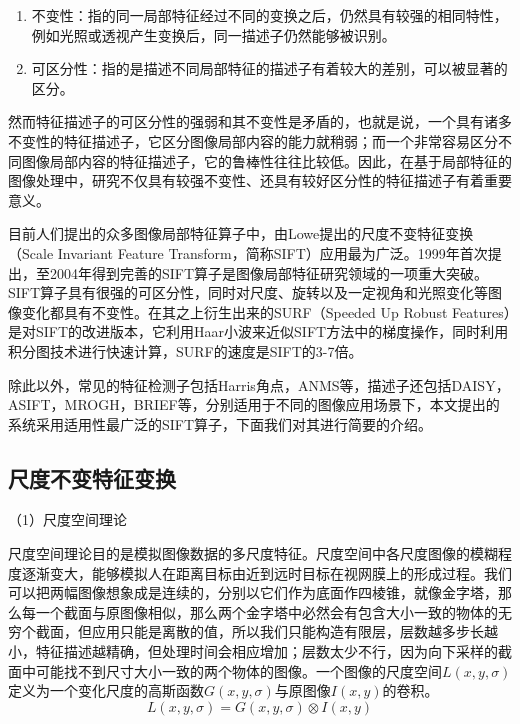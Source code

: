 \begin{enumerate}
\item 不变性：指的同一局部特征经过不同的变换之后，仍然具有较强的相同特性，例如光照或透视产生变换后，同一描述子仍然能够被识别。
\item 可区分性：指的是描述不同局部特征的描述子有着较大的差别，可以被显著的区分。
\end{enumerate}

然而特征描述子的可区分性的强弱和其不变性是矛盾的，也就是说，一个具有诸多不变性的特征描述子，它区分图像局部内容的能力就稍弱；而一个非常容易区分不同图像局部内容的特征描述子，它的鲁棒性往往比较低。因此，在基于局部特征的图像处理中，研究不仅具有较强不变性、还具有较好区分性的特征描述子有着重要意义。

目前人们提出的众多图像局部特征算子中，由Lowe提出的尺度不变特征变换（Scale Invariant Feature Transform，简称SIFT）应用最为广泛。1999年首次提出，至2004年得到完善\cite{Lowe:2004uq}的SIFT算子是图像局部特征研究领域的一项重大突破。SIFT算子具有很强的可区分性，同时对尺度、旋转以及一定视角和光照变化等图像变化都具有不变性。在其之上衍生出来的SURF（Speeded Up Robust Features）是对SIFT的改进版本，它利用Haar小波来近似SIFT方法中的梯度操作，同时利用积分图技术进行快速计算，SURF的速度是SIFT的3-7倍。

除此以外，常见的特征检测子包括Harris角点，ANMS等，描述子还包括DAISY，ASIFT，MROGH，BRIEF等，分别适用于不同的图像应用场景下，本文提出的系统采用适用性最广泛的SIFT算子，下面我们对其进行简要的介绍。

\subsection{尺度不变特征变换}

（1）尺度空间理论

尺度空间理论目的是模拟图像数据的多尺度特征。尺度空间中各尺度图像的模糊程度逐渐变大，能够模拟人在距离目标由近到远时目标在视网膜上的形成过程。我们可以把两幅图像想象成是连续的，分别以它们作为底面作四棱锥，就像金字塔，那么每一个截面与原图像相似，那么两个金字塔中必然会有包含大小一致的物体的无穷个截面，但应用只能是离散的值，所以我们只能构造有限层，层数越多步长越小，特征描述越精确，但处理时间会相应增加；层数太少不行，因为向下采样的截面中可能找不到尺寸大小一致的两个物体的图像。一个图像的尺度空间\(L(x,y,\sigma)\)定义为一个变化尺度的高斯函数\(G(x,y,\sigma)\)与原图像\(I(x,y)\)的卷积。
\begin{equation}
  L(x,y,\sigma) = G(x,y,\sigma) \otimes I(x,y)
\end{equation}

